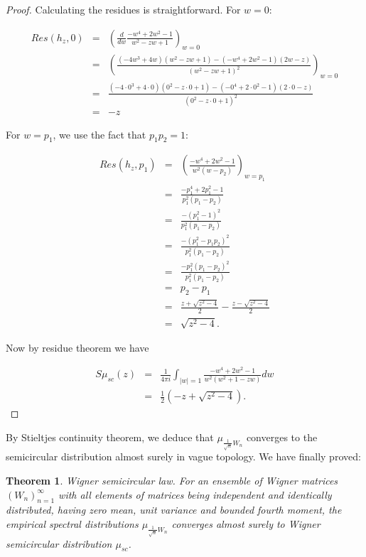 \documentclass[12pt,a4paper,leqno]{report}
\theoremstyle{plain}
\newtheorem{theo}[equation]{Theorem}
\theoremstyle{definition}
\theoremstyle{remark}
\begin{document}
\begin{proof}
Calculating the residues is straightforward. For $w=0$:

\begin{eqnarray*}
Res(h_z,0) & = &
\left(\frac{d}{dw} \frac{-w^4+2w^2-1}{w^2-zw+1} \right)_{w=0}\\
& = & \left(\frac{(-4w^3+4w)(w^2-zw+1)-(-w^4+2w^2-1)(2w-z)}{(w^2-zw+1)^2} \right)_{w=0}\\
& = & \frac{(-4\cdot 0^3+4 \cdot 0)(0^2-z\cdot 0+1)-(-0^4+2\cdot 0^2-1)(2\cdot 0-z)}{(0^2-z\cdot 0+1)^2} \\
& = & -z
\end{eqnarray*}

For $w=p_1$, we use the fact that $p_1p_2 = 1$:

\begin{eqnarray*}
Res(h_z,p_1) & = &
\left(\frac{-w^4+2w^2-1}{w^2(w-p_2)} \right)_{w=p_1}\\
& = & \frac{-p_1^4+2p_1^2-1}{p_1^2(p_1-p_2)}\\
& = & \frac{-(p_1^2-1)^2}{p_1^2(p_1-p_2)}\\
& = & \frac{-(p_1^2-p_1p_2)^2}{p_1^2(p_1-p_2)}\\
& = & \frac{-p_1^2(p_1-p_2)^2}{p_1^2(p_1-p_2)}\\
& = & p_2-p_1\\
& = & \frac{z + \sqrt{z^2-4}}{2} - \frac{z - \sqrt{z^2-4}}{2}\\
& = & \sqrt{z^2-4}.
\end{eqnarray*}

Now by residue theorem we have

\begin{eqnarray*}
S\mu_{sc}(z) & = & \frac{1}{4\pi i} \int_{|w|=1} \frac{-w^4+2w^2-1}{w^2(w^2+1 -zw)} dw\\
& = & \frac{1}{2} ( -z + \sqrt{z^2-4}).
\end{eqnarray*}

\end{proof}

By Stieltjes continuity theorem, we deduce that $\mu_{\frac{1}{\sqrt{n}}W_n}$ converges to the semicircular distribution almost surely in vague topology. We have finally proved:

\begin{theo}
\emph{Wigner semicircular law.} For an ensemble of Wigner matrices $(W_n)_{n=1}^{\infty}$ with all elements of matrices being independent and identically distributed, having zero mean, unit variance and bounded fourth moment, the empirical spectral distributions $\mu_{\frac{1}{\sqrt{n}}W_n}$ converges almost surely to Wigner semicircular distribution $\mu_{sc}$.
\end{theo}
\end{document}
